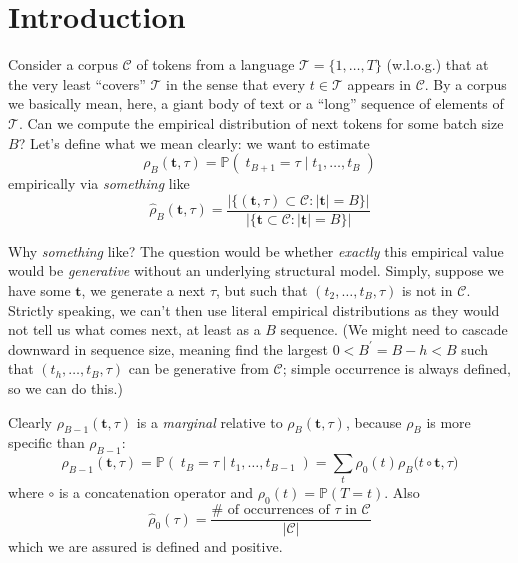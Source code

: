 \documentclass[11pt, oneside]{amsart}   	%
\title{}
\author{W. Ross Morrow}
\date{}							%
\begin{document}
\maketitle

\section{Introduction}

Consider a corpus $\mathcal{C}$ of tokens from a language $\mathcal{T} = \{1,\dotsc,T\}$ (w.l.o.g.) that at the very least ``covers'' $\mathcal{T}$ in the sense that every $t \in \mathcal{T}$ appears in $\mathcal{C}$. By a corpus we basically mean, here, a giant body of text or a ``long'' sequence of elements of $\mathcal{T}$. Can we compute the empirical distribution of next tokens for some batch size $B$? Let's define what we mean clearly: we want to estimate
\begin{equation*}
	\rho_B(\mathbf{t}, \tau) = \mathbb{P}(\; t_{B+1} = \tau \; | \; t_1, \dotsc , t_B \; )
\end{equation*}
empirically via {\em something} like
\begin{equation*}
	\hat{\rho}_B(\mathbf{t},\tau) 
		= \frac{ | \{ (\mathbf{t}, \tau) \subset \mathcal{C} : |\mathbf{t}| = B \} | }
			{ | \{ \mathbf{t} \subset \mathcal{C} : |\mathbf{t}| = B \} | }
\end{equation*}

Why {\em something} like? The question would be whether {\em exactly} this empirical value would be {\em generative} without an underlying structural model. Simply, suppose we have some $\mathbf{t}$, we generate a next $\tau$, but such that $(t_2,\dotsc,t_B,\tau)$ is not in $\mathcal{C}$. Strictly speaking, we can't then use literal empirical distributions as they would not tell us what comes next, at least as a $B$ sequence. (We might need to cascade downward in sequence size, meaning find the largest $0 < B^\prime = B-h < B$ such that $(t_h,\dotsc,t_B,\tau)$ can be generative from $\mathcal{C}$; simple occurrence is always defined, so we can do this.) 

Clearly $\rho_{B-1}(\mathbf{t}, \tau)$ is a {\em marginal} relative to $\rho_B(\mathbf{t}, \tau)$, because $\rho_B$ is more specific than $\rho_{B-1}$:
\begin{equation*}
	\rho_{B-1}(\mathbf{t}, \tau) 
		= \mathbb{P}(\; t_{B} = \tau \; | \; t_1, \dotsc , t_{B-1} \; )
		= \sum_t \rho_{0}(t) \rho_B\big( t \circ \mathbf{t}, \tau\big)
\end{equation*}
where $\circ$ is a concatenation operator and $\rho_{0}(t) = \mathbb{P}(T = t)$. Also
\begin{equation*}
	\hat{\rho}_{0}(\tau) = \frac{\#\text{ of occurrences of }\tau\text{ in }\mathcal{C}}{|\mathcal{C}|}
\end{equation*}
which we are assured is defined and positive. 
\end{document}
